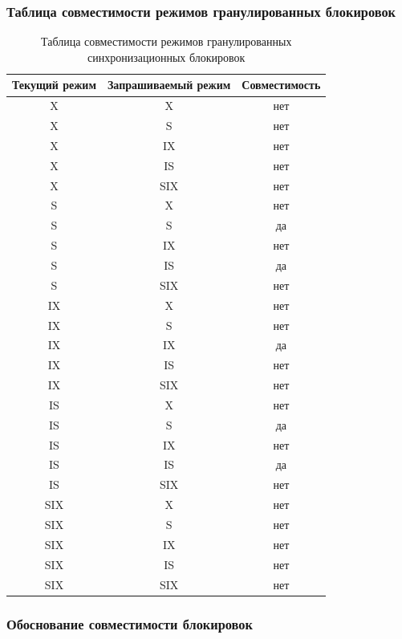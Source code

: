 \documentclass[a4paper,12pt]{article}
\begin{document}
\subsubsection{Таблица совместимости режимов гранулированных блокировок}

\begin{table}[h!]
    \centering
    \begin{tabular}{|c|c|c|}
        \hline
        \textbf{Текущий режим} & \textbf{Запрашиваемый режим} & \textbf{Совместимость} \\
        \hline
        X & X & нет \\
        X & S & нет \\
        X & IX & нет \\
        X & IS & нет \\
        X & SIX & нет \\
        \hline
        S & X & нет \\
        S & S & да \\
        S & IX & нет \\
        S & IS & да \\
        S & SIX & нет \\
        \hline
        IX & X & нет \\
        IX & S & нет \\
        IX & IX & да \\
        IX & IS & нет \\
        IX & SIX & нет \\
        \hline
        IS & X & нет \\
        IS & S & да \\
        IS & IX & нет \\
        IS & IS & да \\
        IS & SIX & нет \\
        \hline
        SIX & X & нет \\
        SIX & S & нет \\
        SIX & IX & нет \\
        SIX & IS & нет \\
        SIX & SIX & нет \\
        \hline
    \end{tabular}
    \caption{Таблица совместимости режимов гранулированных синхронизационных блокировок}
\end{table}

\subsubsection{Обоснование совместимости блокировок}
\end{document}
